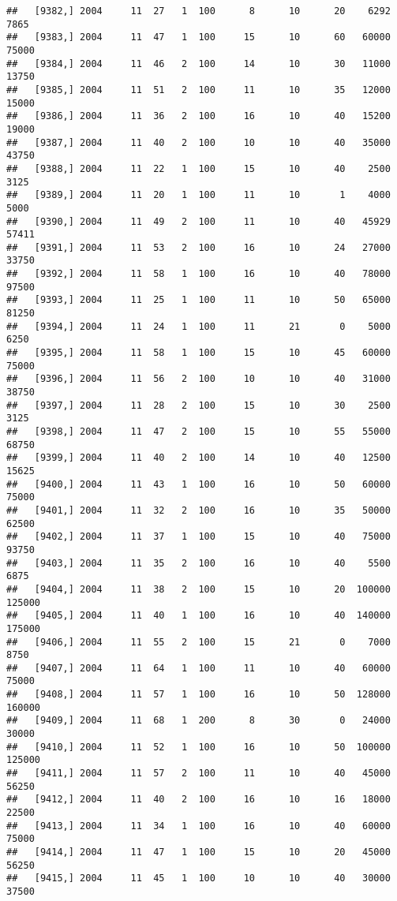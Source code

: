 \documentclass{article}\usepackage[]{graphicx}\usepackage[]{color}
\makeatletter
\newenvironment{kframe}{%
 \def\at@end@of@kframe{}%
 \ifinner\ifhmode%
  \def\at@end@of@kframe{\end{minipage}}%
  \begin{minipage}{\columnwidth}%
 \fi\fi%
 \def\FrameCommand##1{\hskip\@totalleftmargin \hskip-\fboxsep
 \colorbox{shadecolor}{##1}\hskip-\fboxsep
     \hskip-\linewidth \hskip-\@totalleftmargin \hskip\columnwidth}%
 \MakeFramed {\advance\hsize-\width
   \@totalleftmargin\z@ \linewidth\hsize
   \@setminipage}}%
 {\par\unskip\endMakeFramed%
 \at@end@of@kframe}
\newenvironment{knitrout}{}{} %
\makeatother
\begin{document}
\begin{knitrout}
\begin{kframe}
\begin{verbatim}
##   [9382,] 2004     11  27   1  100      8      10      20    6292    7865
##   [9383,] 2004     11  47   1  100     15      10      60   60000   75000
##   [9384,] 2004     11  46   2  100     14      10      30   11000   13750
##   [9385,] 2004     11  51   2  100     11      10      35   12000   15000
##   [9386,] 2004     11  36   2  100     16      10      40   15200   19000
##   [9387,] 2004     11  40   2  100     10      10      40   35000   43750
##   [9388,] 2004     11  22   1  100     15      10      40    2500    3125
##   [9389,] 2004     11  20   1  100     11      10       1    4000    5000
##   [9390,] 2004     11  49   2  100     11      10      40   45929   57411
##   [9391,] 2004     11  53   2  100     16      10      24   27000   33750
##   [9392,] 2004     11  58   1  100     16      10      40   78000   97500
##   [9393,] 2004     11  25   1  100     11      10      50   65000   81250
##   [9394,] 2004     11  24   1  100     11      21       0    5000    6250
##   [9395,] 2004     11  58   1  100     15      10      45   60000   75000
##   [9396,] 2004     11  56   2  100     10      10      40   31000   38750
##   [9397,] 2004     11  28   2  100     15      10      30    2500    3125
##   [9398,] 2004     11  47   2  100     15      10      55   55000   68750
##   [9399,] 2004     11  40   2  100     14      10      40   12500   15625
##   [9400,] 2004     11  43   1  100     16      10      50   60000   75000
##   [9401,] 2004     11  32   2  100     16      10      35   50000   62500
##   [9402,] 2004     11  37   1  100     15      10      40   75000   93750
##   [9403,] 2004     11  35   2  100     16      10      40    5500    6875
##   [9404,] 2004     11  38   2  100     15      10      20  100000  125000
##   [9405,] 2004     11  40   1  100     16      10      40  140000  175000
##   [9406,] 2004     11  55   2  100     15      21       0    7000    8750
##   [9407,] 2004     11  64   1  100     11      10      40   60000   75000
##   [9408,] 2004     11  57   1  100     16      10      50  128000  160000
##   [9409,] 2004     11  68   1  200      8      30       0   24000   30000
##   [9410,] 2004     11  52   1  100     16      10      50  100000  125000
##   [9411,] 2004     11  57   2  100     11      10      40   45000   56250
##   [9412,] 2004     11  40   2  100     16      10      16   18000   22500
##   [9413,] 2004     11  34   1  100     16      10      40   60000   75000
##   [9414,] 2004     11  47   1  100     15      10      20   45000   56250
##   [9415,] 2004     11  45   1  100     10      10      40   30000   37500

\end{verbatim}
\end{kframe}
\end{knitrout}
\end{document}
